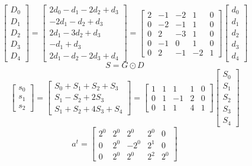 \documentclass{article}%
\begin{document}
\[%
\left[\begin{matrix}D_{0}\\D_{1}\\D_{2}\\D_{3}\\D_{4}\end{matrix}\right] = \left[\begin{matrix}2 d_{0} - d_{1} - 2 d_{2} + d_{3}\\- 2 d_{1} - d_{2} + d_{3}\\2 d_{1} - 3 d_{2} + d_{3}\\- d_{1} + d_{3}\\2 d_{1} - d_{2} - 2 d_{3} + d_{4}\end{matrix}\right] = \left[\begin{matrix}2 & -1 & -2 & 1 & 0\\0 & -2 & -1 & 1 & 0\\0 & 2 & -3 & 1 & 0\\0 & -1 & 0 & 1 & 0\\0 & 2 & -1 & -2 & 1\end{matrix}\right] \left[\begin{matrix}d_{0}\\d_{1}\\d_{2}\\d_{3}\\d_{4}\end{matrix}\right]%
\]%
\[%
S = G \odot D%
\]%
\[%
\left[\begin{matrix}s_{0}\\s_{1}\\s_{2}\end{matrix}\right] = \left[\begin{matrix}S_{0} + S_{1} + S_{2} + S_{3}\\S_{1} - S_{2} + 2 S_{3}\\S_{1} + S_{2} + 4 S_{3} + S_{4}\end{matrix}\right] = \left[\begin{matrix}1 & 1 & 1 & 1 & 0\\0 & 1 & -1 & 2 & 0\\0 & 1 & 1 & 4 & 1\end{matrix}\right] \left[\begin{matrix}S_{0}\\S_{1}\\S_{2}\\S_{3}\\S_{4}\end{matrix}\right]%
\]%
\[%
a^{t} = \left[\begin{matrix}2^{0} & 2^{0} & 2^{0} & 2^{0} & 0\\0 & 2^{0} & - 2^{0} & 2^{1} & 0\\0 & 2^{0} & 2^{0} & 2^{2} & 2^{0}\end{matrix}\right]%
\]%
\end{document}
